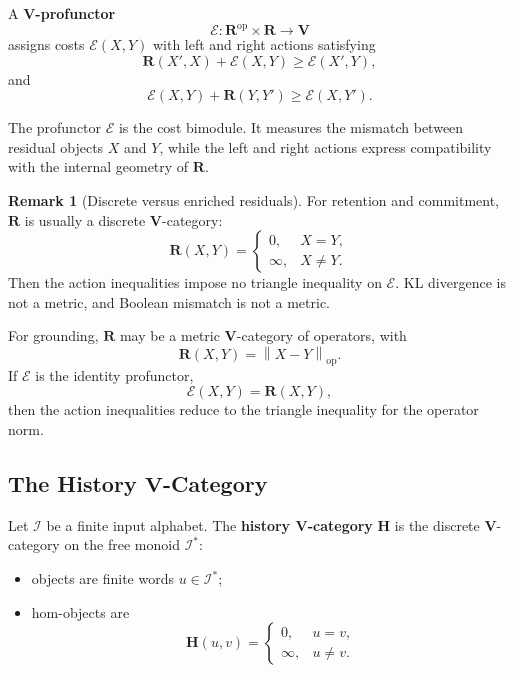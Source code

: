 \documentclass[12pt]{article}
\theoremstyle{definition}
\newtheorem{remark}[theorem]{Remark}
\newcommand{\norm}[1]{\left\lVert#1\right\rVert}
\begin{document}
A \textbf{$\mathbf V$-profunctor}
\[
\mathcal E:\mathbf R^{\mathrm{op}}\times\mathbf R\to\mathbf V
\]
assigns costs $\mathcal E(X,Y)$ with left and right actions satisfying
\[
\mathbf R(X',X)+\mathcal E(X,Y)\ge \mathcal E(X',Y),
\]
and
\[
\mathcal E(X,Y)+\mathbf R(Y,Y')\ge \mathcal E(X,Y').
\]

The profunctor $\mathcal E$ is the cost bimodule.  It measures the mismatch
between residual objects $X$ and $Y$, while the left and right actions express
compatibility with the internal geometry of $\mathbf R$.

\begin{remark}[Discrete versus enriched residuals]
\label{rem:discrete-vs-enriched}
For retention and commitment, $\mathbf R$ is usually a discrete
$\mathbf V$-category:
\[
\mathbf R(X,Y)=
\begin{cases}
0,&X=Y,\\
\infty,&X\neq Y.
\end{cases}
\]
Then the action inequalities impose no triangle inequality on $\mathcal E$.
KL divergence is not a metric, and Boolean mismatch is not a metric.

For grounding, $\mathbf R$ may be a metric $\mathbf V$-category of operators,
with
\[
\mathbf R(X,Y)=
\norm{X-Y}_{\mathrm{op}}.
\]
If $\mathcal E$ is the identity profunctor,
\[
\mathcal E(X,Y)=\mathbf R(X,Y),
\]
then the action inequalities reduce to the triangle inequality for the
operator norm.
\end{remark}

\subsection{The History $\mathbf V$-Category}
\label{subsec:history-category}

Let $\mathcal I$ be a finite input alphabet.  The \textbf{history
$\mathbf V$-category} $\mathbf H$ is the discrete $\mathbf V$-category on the
free monoid $\mathcal I^*$:
\begin{itemize}[nosep]
\item objects are finite words $u\in\mathcal I^*$;
\item hom-objects are
\[
\mathbf H(u,v)=
\begin{cases}
0,&u=v,\\
\infty,&u\neq v.
\end{cases}
\]
\end{itemize}
\end{document}
